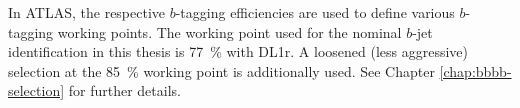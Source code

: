 In ATLAS, the respective $b$-tagging efficiencies are used to define various $b$-tagging 
working points. The working point used for the nominal $b$-jet identification in this 
thesis is 77~\% with DL1r. A loosened (less aggressive) selection at the 85~\% working point 
is additionally used. See Chapter \ref{chap:bbbb-selection} for further details.

